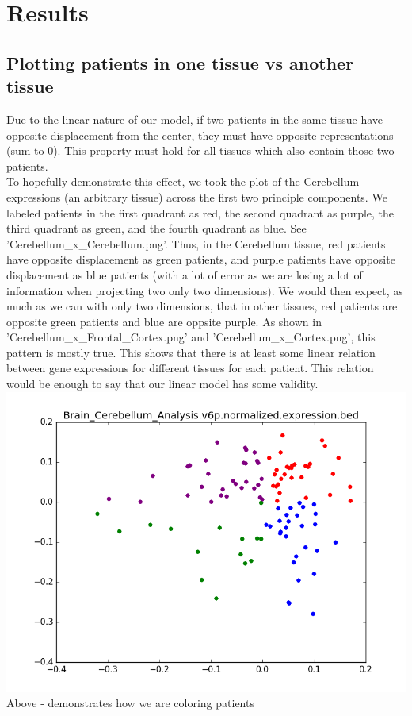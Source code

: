 \documentclass{article}
\begin{document}
\section{Results}

\subsection{Plotting patients in one tissue vs another tissue}

Due to the linear nature of our model, if two patients in the same tissue have opposite displacement from the center, they must have opposite representations (sum to 0). This property must hold for all tissues which also contain those two patients. \\

To hopefully demonstrate this effect, we took the plot of the Cerebellum expressions (an arbitrary tissue) across the first two principle components. We labeled patients in the first quadrant as red, the second quadrant as purple, the third quadrant as green, and the fourth quadrant as blue. See 'Cerebellum\_x\_Cerebellum.png'. Thus, in the Cerebellum tissue, red patients have opposite displacement as green patients, and purple patients have opposite displacement as blue patients (with a lot of error as we are losing a lot of information when projecting two only two dimensions). We would then expect, as much as we can with only two dimensions, that in other tissues, red patients are opposite green patients and blue are oppsite purple. As shown in 'Cerebellum\_x\_Frontal\_Cortex.png' and 'Cerebellum\_x\_Cortex.png', this pattern is mostly true. This shows that there is at least some linear relation between gene expressions for different tissues for each patient. This relation would be enough to say that our linear model has some validity. \\

\includegraphics[scale = 0.6]{Cerebellum_x_Cerebellum}
Above - demonstrates how we are coloring patients
\end{document}
